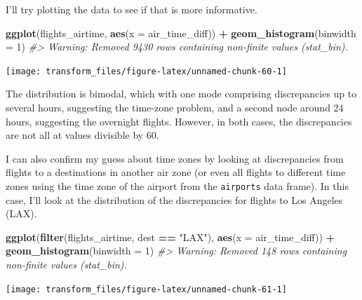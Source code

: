 \documentclass[]{book}
\newenvironment{Shaded}{\begin{snugshade}}{\end{snugshade}}
\newcommand{\CommentTok}[1]{\textcolor[rgb]{0.56,0.35,0.01}{\textit{#1}}}
\newcommand{\DataTypeTok}[1]{\textcolor[rgb]{0.13,0.29,0.53}{#1}}
\newcommand{\DecValTok}[1]{\textcolor[rgb]{0.00,0.00,0.81}{#1}}
\newcommand{\KeywordTok}[1]{\textcolor[rgb]{0.13,0.29,0.53}{\textbf{#1}}}
\newcommand{\NormalTok}[1]{#1}
\newcommand{\OperatorTok}[1]{\textcolor[rgb]{0.81,0.36,0.00}{\textbf{#1}}}
\newcommand{\StringTok}[1]{\textcolor[rgb]{0.31,0.60,0.02}{#1}}
\theoremstyle{plain}
\theoremstyle{remark}
\begin{document}
I'll try plotting the data to see if that is more informative.

\begin{Shaded}
\begin{Highlighting}[]
\KeywordTok{ggplot}\NormalTok{(flights_airtime, }\KeywordTok{aes}\NormalTok{(}\DataTypeTok{x =}\NormalTok{ air_time_diff)) }\OperatorTok{+}
\StringTok{  }\KeywordTok{geom_histogram}\NormalTok{(}\DataTypeTok{binwidth =} \DecValTok{1}\NormalTok{)}
\CommentTok{#> Warning: Removed 9430 rows containing non-finite values (stat_bin).}
\end{Highlighting}
\end{Shaded}

\begin{center}\texttt{[image: transform\_files/figure-latex/unnamed-chunk-60-1]} \end{center}

The distribution is bimodal, which with one mode comprising discrepancies up to several hours, suggesting the time-zone problem, and a second node around 24 hours, suggesting the overnight flights.
However, in both cases, the discrepancies are not all at values divisible by 60.

I can also confirm my guess about time zones by looking at discrepancies from
flights to a destinations in another air zone (or even all flights to different time zones using the time zone of the airport from the \texttt{airports} data frame).
In this case, I'll look at the distribution of the discrepancies for flights
to Los Angeles (LAX).

\begin{Shaded}
\begin{Highlighting}[]
\KeywordTok{ggplot}\NormalTok{(}\KeywordTok{filter}\NormalTok{(flights_airtime, dest }\OperatorTok{==}\StringTok{ "LAX"}\NormalTok{), }\KeywordTok{aes}\NormalTok{(}\DataTypeTok{x =}\NormalTok{ air_time_diff)) }\OperatorTok{+}
\StringTok{  }\KeywordTok{geom_histogram}\NormalTok{(}\DataTypeTok{binwidth =} \DecValTok{1}\NormalTok{)}
\CommentTok{#> Warning: Removed 148 rows containing non-finite values (stat_bin).}
\end{Highlighting}
\end{Shaded}

\begin{center}\texttt{[image: transform\_files/figure-latex/unnamed-chunk-61-1]} \end{center}
\end{document}
